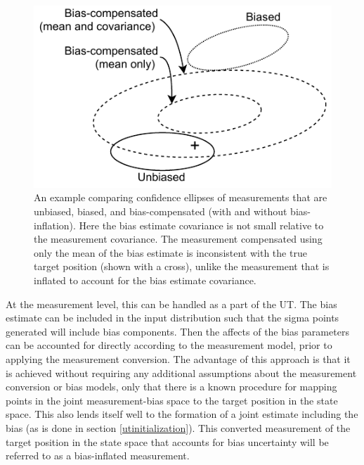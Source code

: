 \documentclass[journal]{IEEEtran}
\begin{document}
 \begin{figure}[ht]
     \centering
     \includegraphics[scale=1.0]{BiasCompensationDiagram.pdf}
     \caption{An example comparing confidence ellipses of measurements that are unbiased, biased, and bias-compensated (with and without bias-inflation). Here the bias estimate covariance is not small relative to the measurement covariance. The measurement compensated using only the mean of the bias estimate is inconsistent with the true target position (shown with a cross), unlike the measurement that is inflated to account for the bias estimate covariance.}
     \label{fig:biascompensationdiagram}
 \end{figure}

At the measurement level, this can be handled as a part of the UT. The bias estimate can be included in the input distribution such that the sigma points generated will include bias components. Then the affects of the bias parameters can be accounted for directly according to the measurement model, prior to applying the measurement conversion. The advantage of this approach is that it is achieved without requiring any additional assumptions about the measurement conversion or bias models, only that there is a known procedure for mapping points in the joint measurement-bias space to the target position in the state space. This also lends itself well to the formation of a joint estimate including the bias (as is done in section \ref{utinitialization}). This converted measurement of the target position in the state space that accounts for bias uncertainty will be referred to as a bias-inflated measurement.
\end{document}
